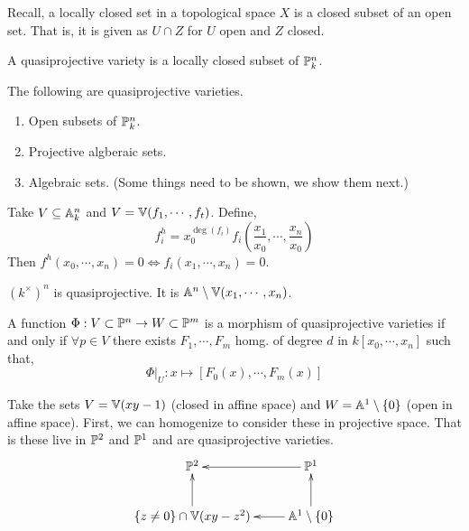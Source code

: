 \documentclass[12pt]{amsart}
\begin{document}
Recall, a locally closed set in a topological space $X$ is a closed subset of an open set. That is, it is given as $U \cap Z$ for $U$ open and $Z$ closed. 

\begin{definition}
    A quasiprojective variety is a locally closed subset of $\P^n_k$. 
\end{definition}

\begin{example}
    The following are quasiprojective varieties.
    \begin{enumerate}
        \item Open subsets of $\P^n_k$. 
        \item Projective algberaic sets. 
        \item Algebraic sets. (Some things need to be shown, we show them next.)
    \end{enumerate}
\end{example}

Take $V \subseteq \A^n_k$ and $V = \V(f_1, \cdots, f_t)$. Define, 
\[ f_i^h = x_0^{\deg(f_i)} f_i\left(\frac{x_1}{x_0}, \cdots, \frac{x_n}{x_0}\right)\]
Then $f^h(x_0, \cdots, x_n) = 0 \iff f_i(x_1, \cdots, x_n) = 0$.


\begin{example}
    $(k^\times)^n$ is quasiprojective. It is $\A^n \setminus \V(x_1, \cdots, x_n)$. 
\end{example}

\begin{definition}
    A function $\Phi: V \subset \P^n \to W \subset \P^m$ is a morphism of quasiprojective varieties if and only if $\forall p \in V$ there exists $F_1, \cdots, F_m$ homg. of degree $d$ in $k[x_0, \cdots, x_n]$ such that,
    \[ \Phi|_U: x \mapsto [F_0(x), \cdots, F_m(x)]\] 
\end{definition}

\begin{example}
    Take the sets $V = \V(xy-1)$ (closed in affine space) and $W = \A^1 \setminus \{0\}$ (open in affine space). First, we can homogenize to consider these in projective space. That is these live in $\P^2$ and $\P^1$ and are quasiprojective varieties. 
    \begin{align*}
        \xymatrix{ 
            \P^2 & \P^1 \ar[l] \\
            \{z \neq 0 \} \cap \V(xy-z^2) \ar[u] & \A^1 \setminus \{0 \} \ar[l] \ar[u] \\
        }
    \end{align*}

\end{example}
\end{document}
